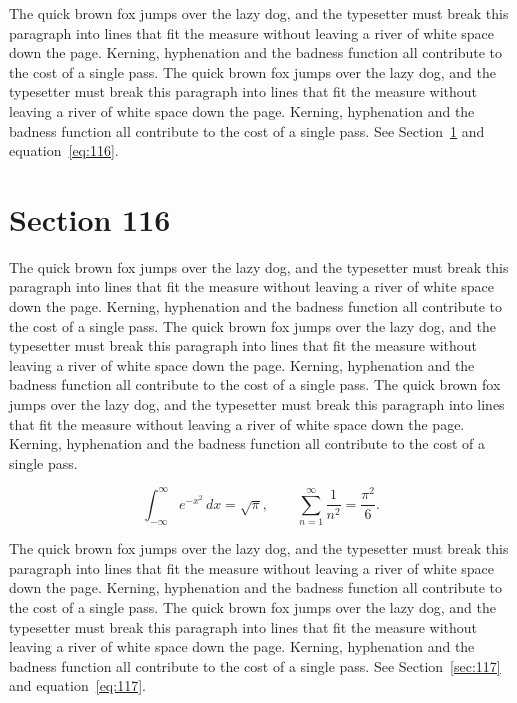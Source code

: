 \documentclass{article}
\begin{document}
The quick brown fox jumps over the lazy dog, and the typesetter must break this paragraph into lines that fit the measure without leaving a river of white space down the page. Kerning, hyphenation and the badness function all contribute to the cost of a single pass. The quick brown fox jumps over the lazy dog, and the typesetter must break this paragraph into lines that fit the measure without leaving a river of white space down the page. Kerning, hyphenation and the badness function all contribute to the cost of a single pass. 
See Section~\ref{sec:116} and equation~\eqref{eq:116}.
\section{Section 116}
\label{sec:116}
The quick brown fox jumps over the lazy dog, and the typesetter must break this paragraph into lines that fit the measure without leaving a river of white space down the page. Kerning, hyphenation and the badness function all contribute to the cost of a single pass. The quick brown fox jumps over the lazy dog, and the typesetter must break this paragraph into lines that fit the measure without leaving a river of white space down the page. Kerning, hyphenation and the badness function all contribute to the cost of a single pass. The quick brown fox jumps over the lazy dog, and the typesetter must break this paragraph into lines that fit the measure without leaving a river of white space down the page. Kerning, hyphenation and the badness function all contribute to the cost of a single pass. 

\begin{equation}\label{eq:116}
\int_{-\infty}^{\infty} e^{-x^{2}}\,dx = \sqrt{\pi}, \qquad
\sum_{n=1}^{\infty} \frac{1}{n^{2}} = \frac{\pi^{2}}{6}.
\end{equation}

The quick brown fox jumps over the lazy dog, and the typesetter must break this paragraph into lines that fit the measure without leaving a river of white space down the page. Kerning, hyphenation and the badness function all contribute to the cost of a single pass. The quick brown fox jumps over the lazy dog, and the typesetter must break this paragraph into lines that fit the measure without leaving a river of white space down the page. Kerning, hyphenation and the badness function all contribute to the cost of a single pass. 
See Section~\ref{sec:117} and equation~\eqref{eq:117}.
\end{document}

